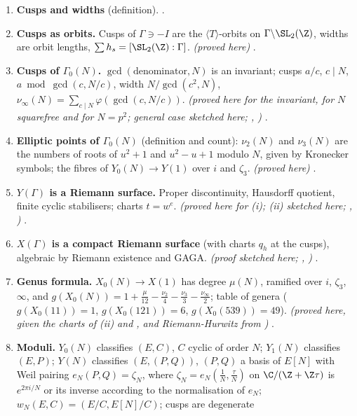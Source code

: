 \begin{enumerate}[label=\textbf{\thechapter.\arabic*}]
\item \textbf{Cusps and widths} (definition). .
\item \textbf{Cusps as orbits.} Cusps of $\Gamma\ni-I$ are the $\langle T\rangle$-orbits on $\Gamma\backslash\SL_2(\Z)$, widths are orbit lengths, $\sum h_s=[\SL_2(\Z):\Gamma]$. \emph{(proved here)}
.
\item \textbf{Cusps of $\Gamma_0(N)$.} $\gcd(\text{denominator},N)$ is an invariant; cusps $a/c$, $c\mid N$, $a\bmod\gcd(c,N/c)$, width $N/\gcd(c^2,N)$, $\nu_\infty(N)=\sum_{c\mid N}\varphi(\gcd(c,N/c))$.
\emph{(proved here for the invariant, for $N$ squarefree and for $N=p^2$; general case sketched here; \cite{DiamondShurman}, \cite{Ogg73})} .
\item \textbf{Elliptic points of $\Gamma_0(N)$} (definition and count): $\nu_2(N)$ and $\nu_3(N)$ are the numbers of roots of $u^2+1$ and $u^2-u+1$ modulo $N$, given by Kronecker symbols; the
fibres of $Y_0(N)\to Y(1)$ over $i$ and $\zeta_3$. \emph{(proved here)} .
\item \textbf{$Y(\Gamma)$ is a Riemann surface.} Proper discontinuity, Hausdorff quotient, finite cyclic stabilisers; charts $t=w^e$. \emph{(proved here for (i); (ii) sketched here;
\cite{DiamondShurman}, \cite{Shimura71})} .
\item \textbf{$X(\Gamma)$ is a compact Riemann surface} (with charts $q_h$ at the cusps), algebraic by Riemann existence and GAGA. \emph{(proof sketched here; \cite{DiamondShurman},
)} .
\item \textbf{Genus formula.} $X_0(N)\to X(1)$ has degree $\mu(N)$, ramified over $i$, $\zeta_3$, $\infty$, and $g(X_0(N))=1+\frac\mu{12}-\frac{\nu_2}4-\frac{\nu_3}3-\frac{\nu_\infty}2$; table of
genera ($g(X_0(11))=1$, $g(X_0(121))=6$, $g(X_0(539))=49$). \emph{(proved here, given the charts of (ii) and , and Riemann-Hurwitz from )} .
\item \textbf{Moduli.} $Y_0(N)$ classifies $(E,C)$, $C$ cyclic of order $N$; $Y_1(N)$ classifies $(E,P)$; $Y(N)$ classifies $(E,(P,Q))$, $(P,Q)$ a basis of $E[N]$ with Weil pairing
$e_N(P,Q)=\zeta_N$, where $\zeta_N=e_N(\frac1N,\frac\tau N)$ on $\C/(\Z+\Z\tau)$ is $e^{2\pi i/N}$ or its inverse according to the normalisation of $e_N$; $w_N(E,C)=(E/C,E[N]/C)$; cusps are degenerate

\end{enumerate}
